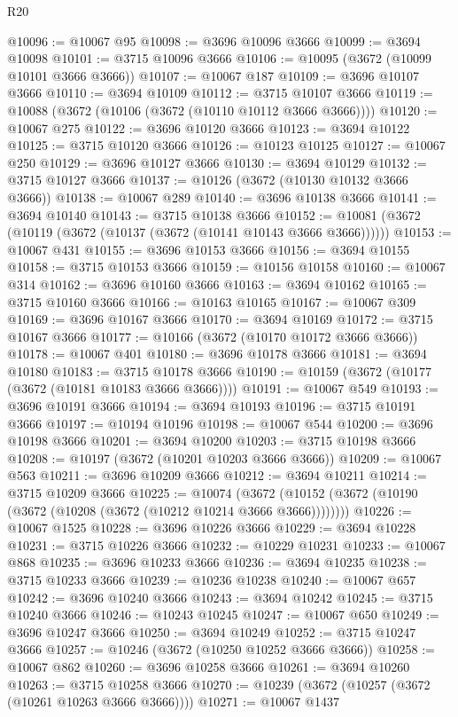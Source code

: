 \begin{lexlean}{R20}
\begin{coremodule}
@10096 := @10067 @95
@10098 := @3696 @10096 @3666
@10099 := @3694 @10098
@10101 := @3715 @10096 @3666
@10106 := @10095 (@3672 (@10099 @10101 @3666 @3666))
@10107 := @10067 @187
@10109 := @3696 @10107 @3666
@10110 := @3694 @10109
@10112 := @3715 @10107 @3666
@10119 := @10088 (@3672 (@10106 (@3672 (@10110 @10112 @3666 @3666))))
@10120 := @10067 @275
@10122 := @3696 @10120 @3666
@10123 := @3694 @10122
@10125 := @3715 @10120 @3666
@10126 := @10123 @10125
@10127 := @10067 @250
@10129 := @3696 @10127 @3666
@10130 := @3694 @10129
@10132 := @3715 @10127 @3666
@10137 := @10126 (@3672 (@10130 @10132 @3666 @3666))
@10138 := @10067 @289
@10140 := @3696 @10138 @3666
@10141 := @3694 @10140
@10143 := @3715 @10138 @3666
@10152 := @10081 (@3672 (@10119 (@3672 (@10137 (@3672 (@10141 @10143 @3666 @3666))))))
@10153 := @10067 @431
@10155 := @3696 @10153 @3666
@10156 := @3694 @10155
@10158 := @3715 @10153 @3666
@10159 := @10156 @10158
@10160 := @10067 @314
@10162 := @3696 @10160 @3666
@10163 := @3694 @10162
@10165 := @3715 @10160 @3666
@10166 := @10163 @10165
@10167 := @10067 @309
@10169 := @3696 @10167 @3666
@10170 := @3694 @10169
@10172 := @3715 @10167 @3666
@10177 := @10166 (@3672 (@10170 @10172 @3666 @3666))
@10178 := @10067 @401
@10180 := @3696 @10178 @3666
@10181 := @3694 @10180
@10183 := @3715 @10178 @3666
@10190 := @10159 (@3672 (@10177 (@3672 (@10181 @10183 @3666 @3666))))
@10191 := @10067 @549
@10193 := @3696 @10191 @3666
@10194 := @3694 @10193
@10196 := @3715 @10191 @3666
@10197 := @10194 @10196
@10198 := @10067 @544
@10200 := @3696 @10198 @3666
@10201 := @3694 @10200
@10203 := @3715 @10198 @3666
@10208 := @10197 (@3672 (@10201 @10203 @3666 @3666))
@10209 := @10067 @563
@10211 := @3696 @10209 @3666
@10212 := @3694 @10211
@10214 := @3715 @10209 @3666
@10225 := @10074
    (@3672 (@10152 (@3672 (@10190 (@3672 (@10208 (@3672 (@10212 @10214 @3666 @3666))))))))
@10226 := @10067 @1525
@10228 := @3696 @10226 @3666
@10229 := @3694 @10228
@10231 := @3715 @10226 @3666
@10232 := @10229 @10231
@10233 := @10067 @868
@10235 := @3696 @10233 @3666
@10236 := @3694 @10235
@10238 := @3715 @10233 @3666
@10239 := @10236 @10238
@10240 := @10067 @657
@10242 := @3696 @10240 @3666
@10243 := @3694 @10242
@10245 := @3715 @10240 @3666
@10246 := @10243 @10245
@10247 := @10067 @650
@10249 := @3696 @10247 @3666
@10250 := @3694 @10249
@10252 := @3715 @10247 @3666
@10257 := @10246 (@3672 (@10250 @10252 @3666 @3666))
@10258 := @10067 @862
@10260 := @3696 @10258 @3666
@10261 := @3694 @10260
@10263 := @3715 @10258 @3666
@10270 := @10239 (@3672 (@10257 (@3672 (@10261 @10263 @3666 @3666))))
@10271 := @10067 @1437

\end{coremodule}
\end{lexlean}
